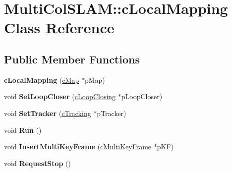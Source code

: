\hypertarget{classMultiColSLAM_1_1cLocalMapping}{}\section{Multi\+Col\+S\+L\+AM\+:\+:c\+Local\+Mapping Class Reference}
\label{classMultiColSLAM_1_1cLocalMapping}
\subsection*{Public Member Functions}
\begin{DoxyCompactItemize}
\item 
{\bfseries c\+Local\+Mapping} (\hyperlink{classMultiColSLAM_1_1cMap}{c\+Map} $\ast$p\+Map)\hypertarget{classMultiColSLAM_1_1cLocalMapping_a606c0c39e964b07d8536bee395d53672}{}\label{classMultiColSLAM_1_1cLocalMapping_a606c0c39e964b07d8536bee395d53672}

\item 
void {\bfseries Set\+Loop\+Closer} (\hyperlink{classMultiColSLAM_1_1cLoopClosing}{c\+Loop\+Closing} $\ast$p\+Loop\+Closer)\hypertarget{classMultiColSLAM_1_1cLocalMapping_a3788b4ea0d6b6e09854b72e182b8559c}{}\label{classMultiColSLAM_1_1cLocalMapping_a3788b4ea0d6b6e09854b72e182b8559c}

\item 
void {\bfseries Set\+Tracker} (\hyperlink{classMultiColSLAM_1_1cTracking}{c\+Tracking} $\ast$p\+Tracker)\hypertarget{classMultiColSLAM_1_1cLocalMapping_aeef4ce6c5c3c334a08e2243e5f89538a}{}\label{classMultiColSLAM_1_1cLocalMapping_aeef4ce6c5c3c334a08e2243e5f89538a}

\item 
void {\bfseries Run} ()\hypertarget{classMultiColSLAM_1_1cLocalMapping_a3129e350abbae5a59dc58a58903a2a87}{}\label{classMultiColSLAM_1_1cLocalMapping_a3129e350abbae5a59dc58a58903a2a87}

\item 
void {\bfseries Insert\+Multi\+Key\+Frame} (\hyperlink{classMultiColSLAM_1_1cMultiKeyFrame}{c\+Multi\+Key\+Frame} $\ast$p\+KF)\hypertarget{classMultiColSLAM_1_1cLocalMapping_a8e4330c2686903a12b66524d754cd081}{}\label{classMultiColSLAM_1_1cLocalMapping_a8e4330c2686903a12b66524d754cd081}

\item 
void {\bfseries Request\+Stop} ()\hypertarget{classMultiColSLAM_1_1cLocalMapping_a84ded7bd2fd67d0b5d877835eb50c1e1}{}\label{classMultiColSLAM_1_1cLocalMapping_a84ded7bd2fd67d0b5d877835eb50c1e1}


\end{DoxyCompactItemize}
